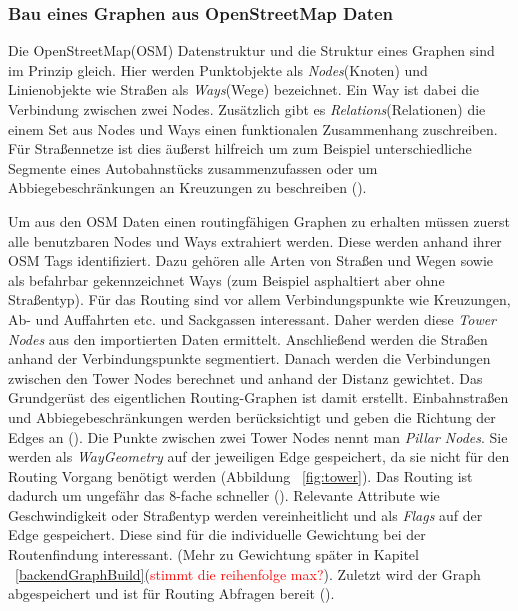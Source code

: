 \documentclass[12pt,a4paper]{article}
\newcommand\todo[1]{\textcolor{red}{#1}}
\begin{document}
\subsubsection{Bau eines Graphen aus OpenStreetMap Daten}
\label{sec:osmgraph}

Die OpenStreetMap(OSM) Datenstruktur und die Struktur eines Graphen sind im Prinzip gleich. Hier werden Punktobjekte als \textit{Nodes}(Knoten) und Linienobjekte wie Straßen als \textit{Ways}(Wege) bezeichnet. Ein Way ist dabei die Verbindung zwischen zwei Nodes. Zusätzlich gibt es \textit{Relations}(Relationen) die einem Set aus Nodes und Ways einen funktionalen Zusammenhang zuschreiben. Für Straßennetze ist dies äußerst hilfreich um zum Beispiel unterschiedliche Segmente eines Autobahnstücks zusammenzufassen oder um Abbiegebeschränkungen an Kreuzungen zu beschreiben (\cite{osmrelation}).

Um aus den OSM Daten einen routingfähigen Graphen zu erhalten müssen zuerst alle benutzbaren Nodes und Ways extrahiert werden. Diese werden anhand ihrer OSM Tags identifiziert. Dazu gehören alle Arten von Straßen und Wegen sowie als befahrbar gekennzeichnet Ways (zum Beispiel asphaltiert aber ohne Straßentyp). Für das Routing sind vor allem Verbindungspunkte wie Kreuzungen, Ab- und Auffahrten etc. und Sackgassen interessant. Daher werden diese \textit{Tower Nodes} aus den importierten Daten ermittelt. Anschließend werden die Straßen anhand der Verbindungspunkte segmentiert. Danach werden die Verbindungen zwischen den Tower Nodes berechnet und anhand der Distanz gewichtet. Das Grundgerüst des eigentlichen Routing-Graphen ist damit erstellt. Einbahnstraßen und Abbiegebeschränkungen werden berücksichtigt und geben die Richtung der Edges an (\cite{osmgraph}). Die Punkte zwischen zwei Tower Nodes nennt man \textit{Pillar Nodes}. Sie werden als \textit{WayGeometry} auf der jeweiligen Edge gespeichert, da sie nicht für den Routing Vorgang benötigt werden (Abbildung ~\ref{fig:tower}). Das Routing ist dadurch um ungefähr das 8-fache schneller (\cite{graphhopper}). Relevante Attribute wie Geschwindigkeit oder Straßentyp werden vereinheitlicht und als \textit{Flags} auf der Edge gespeichert. Diese sind für die individuelle Gewichtung bei der Routenfindung interessant.  (Mehr zu Gewichtung später in Kapitel ~\ref{backendGraphBuild}(\todo{stimmt die reihenfolge max?}). Zuletzt wird der Graph abgespeichert und ist für Routing Abfragen bereit (\cite{osmgraph}). 
\end{document}
